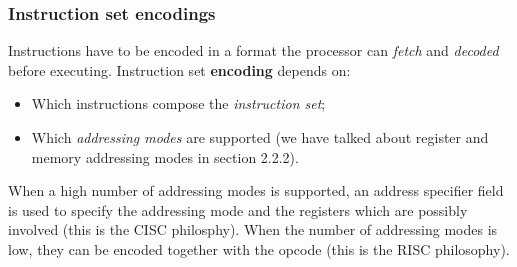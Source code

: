 \documentclass[a4paper,11pt]{article}
\begin{document}
\subsubsection{Instruction set encodings}

Instructions have to be encoded in a format the processor can \textit{fetch} and \textit{decoded} before executing.
Instruction set \textbf{encoding} depends on:
\begin{itemize}
	\item Which instructions compose the \textit{instruction set};
	\item Which \textit{addressing modes} are supported (we have talked about register and memory addressing modes in section 2.2.2).
\end{itemize}
When a high number of addressing modes is supported, an address specifier field is used to specify the addressing mode and the registers which are possibly involved (this is the CISC philosphy).
When the number of addressing modes is low, they can be encoded together with the opcode (this is the RISC philosophy).
\end{document}
